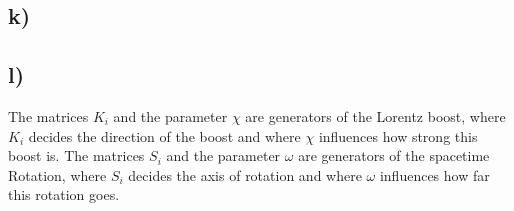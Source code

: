\documentclass[]{scrartcl}
\begin{document}
\subsection{k)}

\subsection{l)}

The matrices $K_i$ and the parameter $\chi$ are generators of the Lorentz boost, where $K_i$ decides the direction of the boost and where $\chi$ influences how strong this boost is. The matrices $S_i$ and the parameter $\omega$ are generators of the spacetime Rotation, where $S_i$ decides the axis of rotation and where $\omega$ influences how far this rotation goes.
\end{document}
